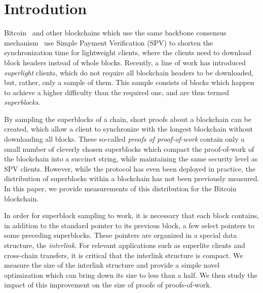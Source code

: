 \section{Introdution}

Bitcoin~\cite{bitcoin} and other blockchains which use the same backbone
consensus mechanism~\cite{EC:GarKiaLeo15} use Simple Payment Verification (SPV)
to shorten the synchronization time for lightweight clients, where the clients
need to download block headers instead of whole blocks. Recently, a line of
work has introduced \emph{superlight} clients, which do not require all
blockchain headers to be downloaded, but, rather, only a sample of them. This
sample consists of blocks which happen to achieve a higher difficulty than the
required one, and are thus termed \emph{superblocks}.

By sampling the superblocks of a chain, short proofs about a blockchain can be
created, which allow a client to synchronize with the longest blockchain without
downloading all blocks. These so-called \emph{proofs of proof-of-work} contain
only a small number of cleverly chosen superblocks which compact the
proof-of-work of the blockchain into a succinct string, while maintaining the
same security level as SPV clients. However, while the protocol has even been deployed in
practice, the distribution of superblocks within a blockchain has not been
previously measured. In this paper, we provide measurements of this distribution for the
Bitcoin blockchain.

In order for superblock sampling to work, it is necessary that each block
contains, in addition to the standard pointer to its previous block, a few
select pointers to some preceding superblocks. These pointers are organized in a
special data structure, the \emph{interlink}. For relevant applications such as
superlite clients and cross-chain transfers, it is critical that the interlink
structure is compact. We measure the size of the interlink structure and provide
a simple novel optimization which can bring down its size to less than a
half. We then study the impact of this improvement on the size of proofs of
proofs-of-work.

